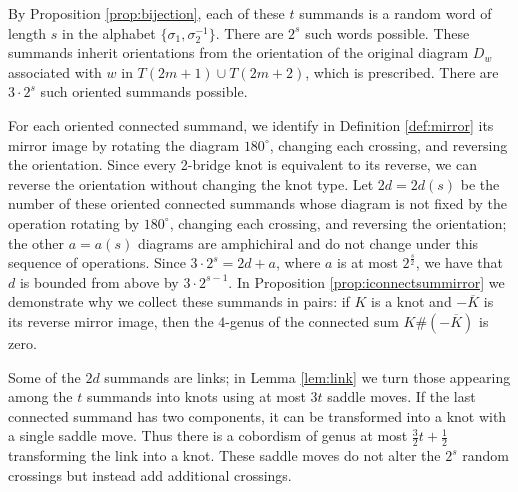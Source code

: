 \documentclass[12pt]{amsart}
\theoremstyle{definition}
\theoremstyle{remark}
\numberwithin{equation}{section}
\def\blue{\color{blue}}
\def\red{\color{red}}
\begin{document}
By Proposition \ref{prop:bijection}, each of these $t$ summands is a random word of length $s$ in the alphabet $\{\sigma_1,\sigma_2^{-1}\}$.  There are $2^s$ such words possible.  These summands inherit orientations from the orientation of the original diagram $D_w$ associated with $w$ in $T(2m+1)\cup T(2m+2)$, which is prescribed.  There are $3\cdot 2^s$ such oriented summands possible.

 For each oriented connected summand, we identify in Definition \ref{def:mirror} its mirror image by rotating the diagram $180^\circ$, changing each crossing, and reversing the orientation.  Since every 2-bridge knot is equivalent to its reverse, we can reverse the orientation without changing the knot type. Let $2d=2d(s)$ be the number of these oriented connected summands whose diagram is not fixed by the operation rotating by $180^\circ$, changing each crossing, and reversing the orientation; the other $a=a(s)$ diagrams are amphichiral and do not change under this sequence of operations. 
Since $3\cdot 2^{s}= 2d+a$, where $a$ is at most $2^{\frac{s}{2}}$, we have that $d$ is bounded from above by $3\cdot 2^{s-1}$.  In Proposition \ref{prop:iconnectsummirror} we demonstrate why we collect these summands in pairs: if $K$ is a knot and $-\overline{K}$ is its reverse mirror image, then the $4$-genus of the connected sum $K\#(-\overline{K})$ is zero. 




Some of the $2d$ summands are links;  in Lemma \ref{lem:link} we turn those appearing among the $t$ summands into knots using at most $3t$ saddle moves. If the last connected summand has two components, it can be transformed into a knot with a single saddle move. Thus there is a cobordism of genus at most $\frac{3}{2}t + \frac{1}{2}$ transforming the link into a knot. These saddle moves do not alter the $2^s$ random crossings but instead add additional crossings.
\end{document}
